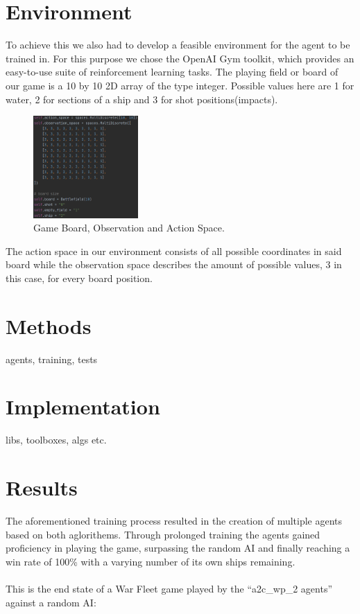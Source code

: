\documentclass[sigconf]{acmart}
\begin{document}
\section{Environment}
To achieve this we also had to develop a feasible environment for the agent to be trained in. For this purpose we chose the OpenAI Gym toolkit, which provides an easy-to-use suite of reinforcement learning tasks.
The playing field or board of our game is a 10 by 10 2D array of the type integer. Possible values here are 1 for water, 2 for sections of a ship and 3 for shot positions(impacts).

\vspace{5mm} %

\begin{figure}
 \includegraphics[width=40mm]{spaces.png}
  \caption{Game Board, Observation and Action Space.}
  \label{fig:spaces}
\end{figure}

The action space in our environment consists of all possible coordinates in said board while the observation space describes the amount of possible values, 3 in this case, for every board position.

\vfill %

\section{Methods}
 agents, training, tests

\section{Implementation}
 libs, toolboxes, algs etc.
 
 \section{Results}
 The aforementioned training process resulted in the creation of multiple agents based on both aglorithems. Through prolonged training the agents gained proficiency in playing the game, surpassing the random AI and finally reaching a win rate of 100\% with a varying number of its own ships remaining.
 \\
 \\
This is the end state of a War Fleet game played by the ``a2c\_wp\_2 agents'' against a random AI:
\end{document}
